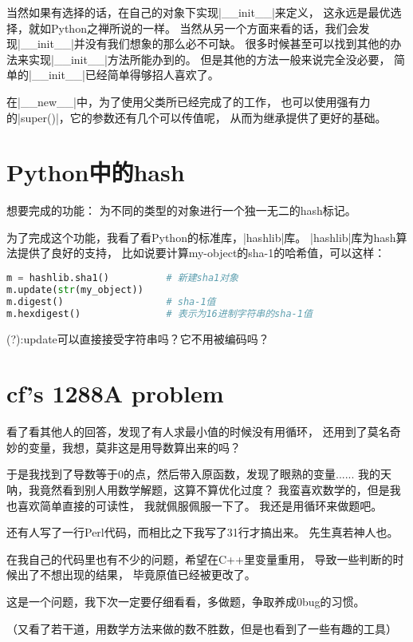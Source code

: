 当然如果有选择的话，在自己的对象下实现\vb|__init__|来定义，
这永远是最优选择，就如Python之禅所说的一样。
当然从另一个方面来看的话，我们会发现\vb|__init__|并没有我们想象的那么必不可缺。
很多时候甚至可以找到其他的办法来实现\vb|__init__|方法所能办到的。
但是其他的方法一般来说完全没必要，
简单的\vb|__init__|已经简单得够招人喜欢了。

在\vb|__new__|中，为了使用父类所已经完成了的工作，
也可以使用强有力的\vb|super()|，它的参数还有几个可以传值呢，
从而为继承提供了更好的基础。


\section{Python中的hash}

想要完成的功能：
为不同的类型的对象进行一个独一无二的hash标记。

为了完成这个功能，我看了看Python的标准库，\vb|hashlib|库。
\vb|hashlib|库为hash算法提供了良好的支持，
比如说要计算my-object的sha-1的哈希值，可以这样：

\begin{lstlisting}[language=Python]
m = hashlib.sha1()          # 新建sha1对象
m.update(str(my_object))
m.digest()                  # sha-1值
m.hexdigest()               # 表示为16进制字符串的sha-1值
\end{lstlisting}

(?):update可以直接接受字符串吗？它不用被编码吗？


\section{cf's 1288A problem}

看了看其他人的回答，发现了有人求最小值的时候没有用循环，
还用到了莫名奇妙的变量，我想，莫非这是用导数算出来的吗？

于是我找到了导数等于0的点，然后带入原函数，发现了眼熟的变量......
我的天呐，我竟然看到别人用数学解题，这算不算优化过度？
我蛮喜欢数学的，但是我也喜欢简单直接的可读性，
我就佩服佩服一下了。
我还是用循环来做题吧。

还有人写了一行Perl代码，而相比之下我写了31行才搞出来。
先生真若神人也。

在我自己的代码里也有不少的问题，希望在C++里变量重用，
导致一些判断的时候出了不想出现的结果，
毕竟原值已经被更改了。

这是一个问题，我下次一定要仔细看看，多做题，争取养成0bug的习惯。

（又看了若干道，用数学方法来做的数不胜数，但是也看到了一些有趣的工具）

